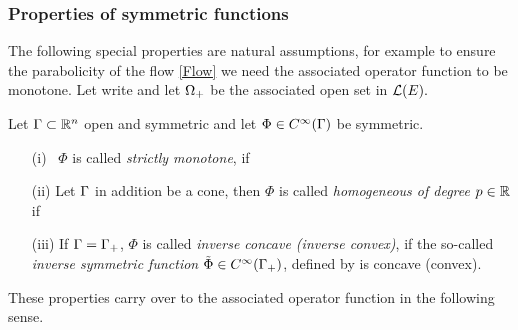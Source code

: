 \subsubsection*{Properties of symmetric functions}
The following special properties are natural assumptions, for example to ensure the parabolicity of the flow \eqref{Flow} we need the associated operator function to be monotone.
Let write
and let $\Omega_{+}$ be the associated open set in $\mathcal{L}(E).$

\begin{defn}\label{PropSymm}
Let $\Gamma\subset\mathbb{R}^{n}$ open and symmetric and let $\Phi\in C^{\infty}(\Gamma)$ be symmetric.
\begin{itemize}
\item[(i)]~$\Phi$ is called {\it{strictly monotone}}, if
\item[(ii)] Let $\Gamma$ in addition be a cone, then $\Phi$ is called {\it{homogeneous of degree $p\in \mathbb{R}$}} if
\item[(iii)] If $\Gamma=\Gamma_{+}$, $\Phi$ is called {\it{inverse concave (inverse convex)}}, if the so-called {\it{inverse symmetric function}} $\tilde\Phi\in C^{\infty}(\Gamma_{+})$, defined by
is concave (convex).
\end{itemize}
\end{defn}

These properties carry over to the associated operator function in the following sense.

{}


